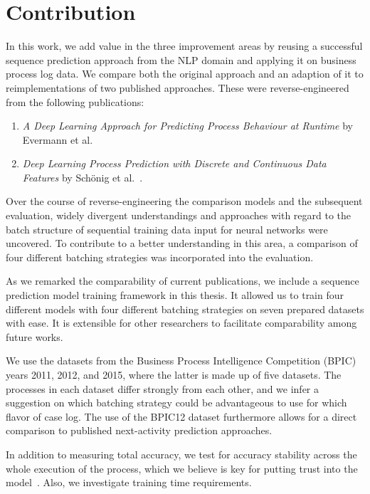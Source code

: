 \section{Contribution}\label{sec:intro:contribution}
In this work, we add value in the three improvement areas by reusing a successful sequence prediction approach from the NLP domain and applying it on business process log data. We compare both the original approach and an adaption of it to reimplementations of two published approaches. These were reverse-engineered from the following publications:

\begin{enumerate}
    \item\textit{A Deep Learning Approach for Predicting Process Behaviour at Runtime} by Evermann et al.~\cite{evermann2016}
    \item\textit{Deep Learning Process Prediction with Discrete and Continuous Data Features} by Schönig et al.~\cite{schoenig2018}.
\end{enumerate}

Over the course of reverse-engineering the comparison models and the subsequent evaluation, widely divergent understandings and approaches with regard to the batch structure of sequential training data input for neural networks were uncovered. To contribute to a better understanding in this area, a comparison of four different batching strategies was incorporated into the evaluation.

As we remarked the comparability of current publications, we include a sequence prediction model training framework in this thesis. It allowed us to train four different models with four different batching strategies on seven prepared datasets with ease. It is extensible for other researchers to facilitate comparability among future works.

We use the datasets from the Business Process Intelligence Competition (BPIC) years 2011, 2012, and 2015, where the latter is made up of five datasets. The processes in each dataset differ strongly from each other, and we infer a suggestion on which batching strategy could be advantageous to use for which flavor of case log. The use of the BPIC12 dataset furthermore allows for a direct comparison to published next-activity prediction approaches.

In addition to measuring total accuracy, we test for accuracy stability across the whole execution of the process, which we believe is key for putting trust into the model~\cite{francescomarino2015, boehmer2018probability}. Also, we investigate training time requirements.

